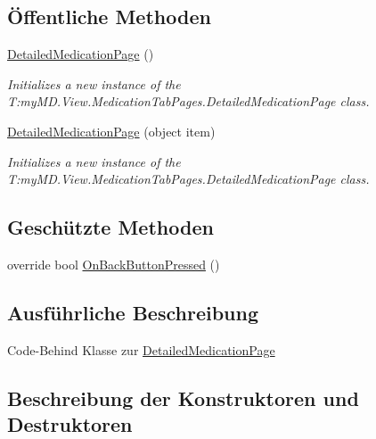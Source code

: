 \subsection*{Öffentliche Methoden}
\begin{DoxyCompactItemize}
\item 
\mbox{\hyperlink{classmy_m_d_1_1_view_1_1_medication_tab_pages_1_1_detailed_medication_page_ad79a81b82b91b290f8e80534849eab79}{Detailed\+Medication\+Page}} ()
\begin{DoxyCompactList}\small\item\em Initializes a new instance of the T\+:my\+M\+D.\+View.\+Medication\+Tab\+Pages.\+Detailed\+Medication\+Page class. \end{DoxyCompactList}\item 
\mbox{\hyperlink{classmy_m_d_1_1_view_1_1_medication_tab_pages_1_1_detailed_medication_page_a85fb3c6227ab81ef9b263263d76726b9}{Detailed\+Medication\+Page}} (object item)
\begin{DoxyCompactList}\small\item\em Initializes a new instance of the T\+:my\+M\+D.\+View.\+Medication\+Tab\+Pages.\+Detailed\+Medication\+Page class. \end{DoxyCompactList}\end{DoxyCompactItemize}
\subsection*{Geschützte Methoden}
\begin{DoxyCompactItemize}
\item 
override bool \mbox{\hyperlink{classmy_m_d_1_1_view_1_1_medication_tab_pages_1_1_detailed_medication_page_ac5b60cfc6f750fe83431e6b3fa850f6b}{On\+Back\+Button\+Pressed}} ()
\end{DoxyCompactItemize}


\subsection{Ausführliche Beschreibung}
Code-\/\+Behind Klasse zur \mbox{\hyperlink{classmy_m_d_1_1_view_1_1_medication_tab_pages_1_1_detailed_medication_page}{Detailed\+Medication\+Page}} 



\subsection{Beschreibung der Konstruktoren und Destruktoren}
\mbox{\label{classmy_m_d_1_1_view_1_1_medication_tab_pages_1_1_detailed_medication_page_ad79a81b82b91b290f8e80534849eab79}} 
